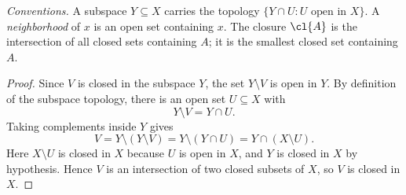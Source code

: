 
\emph{Conventions.} A subspace $Y\subseteq X$ carries the topology
$\{Y\cap U : U \text{ open in } X\}$. A \emph{neighborhood} of $x$ is an open set containing
$x$. The closure $\cl{A}$ is the intersection of all closed sets containing $A$; it is the
smallest closed set containing $A$.

\begin{proof}
Since $V$ is closed in the subspace $Y$, the set $Y\setminus V$ is open in $Y$. By definition
of the subspace topology, there is an open set $U\subseteq X$ with
\[ Y\setminus V=Y\cap U. \]
Taking complements inside $Y$ gives
\[ V=Y\setminus(Y\setminus V)=Y\setminus(Y\cap U)=Y\cap(X\setminus U). \]
Here $X\setminus U$ is closed in $X$ because $U$ is open in $X$, and $Y$ is closed in $X$ by
hypothesis. Hence $V$ is an intersection of two closed subsets of $X$, so $V$ is closed in $X$.
\end{proof}
